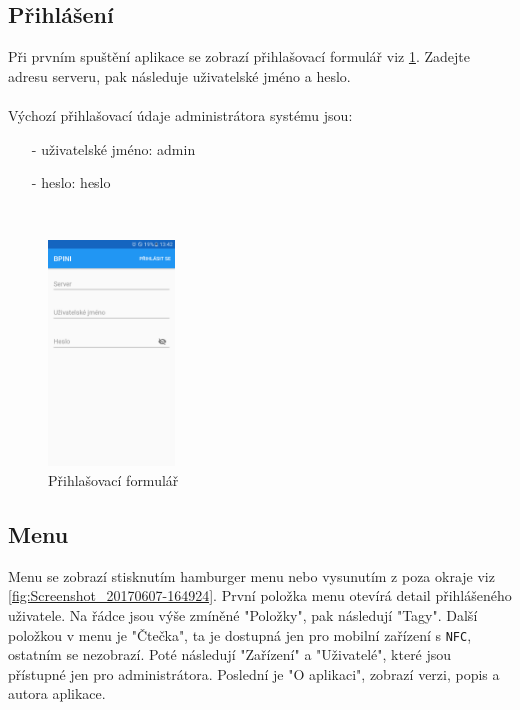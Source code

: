 \documentclass[czech,BP]{thesiskiv}
\begin{document}
\subsection{Přihlášení}	
	
Při prvním spuštění aplikace se zobrazí přihlašovací formulář viz \ref{fig:Screenshot_20170610-134211}.
Zadejte adresu serveru, pak následuje uživatelské jméno a heslo. 
\\\\
Výchozí přihlašovací údaje administrátora systému jsou:
\begin{itemize}[noitemsep]
\item [-] uživatelské jméno: admin
\item [-] heslo: heslo
\end{itemize}
\ \\	
\begin{figure}[h]
	\centering
	\includegraphics[width=0.3\textwidth]{../images/client_android/Screenshot_20170610-134211.png}	
	\caption{Přihlašovací formulář}
	\label{fig:Screenshot_20170610-134211}
\end{figure}

\newpage
\subsection{Menu}
Menu se zobrazí stisknutím hamburger menu nebo vysunutím z poza okraje viz \ref{fig:Screenshot_20170607-164924}.
První položka menu otevírá detail přihlášeného uživatele.
Na  řádce jsou výše zmíněné "Položky", pak následují "Tagy".
Další položkou v menu je "Čtečka", ta je dostupná jen pro mobilní zařízení s \texttt{NFC}, ostatním se nezobrazí.
Poté následují "Zařízení" a "Uživatelé", které jsou přístupné jen pro administrátora.
Poslední je "O aplikaci", zobrazí verzi, popis a autora aplikace.
\end{document}
